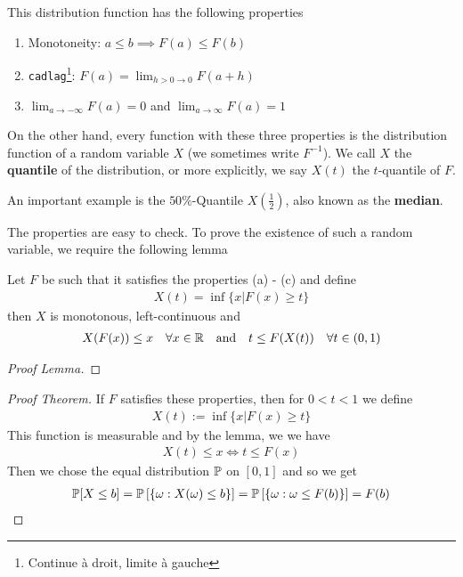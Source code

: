 \begin{thm}[]
This distribution function has the following properties
\begin{enumerate}
  \item Monotoneity: $a \leq b \implies F(a) \leq F(b)$
  \item \texttt{cadlag}\footnote{Continue à droit, limite à gauche}: $F(a) = \lim_{h> 0 \to 0} F(a + h)$
  \item $\lim_{a \to -\infty}F(a) = 0$ and $\lim_{a \to \infty}F(a) = 1$
\end{enumerate}
On the other hand, every function with these three properties is the distribution function of a random variable $X$ (we sometimes write $F^{-1}$).
We call $X$ the \textbf{quantile} of the distribution, or more explicitly, we say $X(t)$ the $t$-quantile of $F$.

An important example is the $50\%$-Quantile $X(\tfrac{1}{2})$, also known as the \textbf{median}.
\end{thm}
The properties are easy to check. 
To prove the existence of such a random variable, we require the following lemma
\begin{lem}[]
  Let $F$ be such that it satisfies the properties (a) - (c) and define 
  \begin{align*}
    X(t) = \inf \{x \big\vert F(x) \geq t\}
  \end{align*}
  then $X$ is monotonous, left-continuous and 
  \begin{align*}
    X(F(x)) \leq x\quad \forall x \in \mathbb{R} \quad \text{and} \quad t \leq F(X(t)) \quad\forall t \in (0,1)
  \end{align*}
\end{lem}
\begin{proof}[Proof Lemma]

\end{proof}
\begin{proof}[Proof Theorem]
  If $F$ satisfies these properties, then for $0 < t < 1$ we define
  \begin{align*}
    X(t) := \inf \{x \big\vert F(x) \geq t\}
  \end{align*}
  This function is measurable and by the lemma, we we have
  \begin{align*}
    X(t) \leq x \iff t \leq F(x)
  \end{align*}
  Then we chose the equal distribution $\mathbb{P}$ on $[0,1]$ and so we get
  \begin{align*}
    \mathbb{P}[X \leq b] = \mathbb{P}\left[\{\omega: X(\omega) \leq b\}\right] = \mathbb{P}\left[\{\omega: \omega \leq F(b)\}\right] = F(b)
  \end{align*}
\end{proof}

